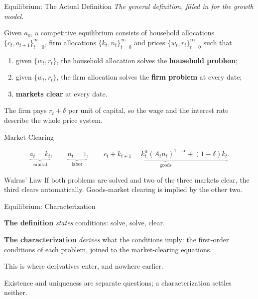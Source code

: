 \documentclass[11pt,aspectratio=169,c]{beamer}
\begin{document}
\begin{frame}{Equilibrium: The Actual Definition}
  \emph{The general definition, filled in for the growth model.}

  \vspace{.2em}
  \begin{definitionbox}
    Given $a_0$, a competitive equilibrium consists of household allocations
    $\{c_t,a_{t+1}\}_{t=0}^{\infty}$, firm allocations
    $\{k_t,n_t\}_{t=0}^{\infty}$ and prices $\{w_t,r_t\}_{t=0}^{\infty}$
    such that
    \begin{enumerate}
      \item given $\{w_t,r_t\}$, the household allocation solves the
      \textbf{household problem};
      \item given $\{w_t,r_t\}$, the firm allocation solves the
      \textbf{firm problem} at every date;
      \item \textbf{markets clear} at every date.
    \end{enumerate}
  \end{definitionbox}

  The firm pays $r_t+\delta$ per unit of capital, so the wage and the interest
  rate describe the whole price system.
\end{frame}

\begin{frame}{Market Clearing}
  \begin{definitionbox}
    \[
      \underbrace{a_t=k_t}_{\text{capital}},
      \qquad
      \underbrace{n_t=1}_{\text{labor}},
      \qquad
      \underbrace{c_t+k_{t+1}=k_t^\alpha(A_tn_t)^{1-\alpha}+(1-\delta)k_t}_{\text{goods}} .
    \]
  \end{definitionbox}

  \begin{block}{Walras' Law}
    If both problems are solved and two of the three markets clear, the third
    clears automatically. Goods-market clearing is implied by the other two.
  \end{block}
\end{frame}

\begin{frame}{Equilibrium: Characterization}
  \begin{definitionbox}
    \textbf{The definition} \emph{states} conditions: solve, solve, clear.\par
    \smallskip
    \textbf{The characterization} \emph{derives} what the conditions imply:
    the first-order conditions of each problem, joined to the market-clearing
    equations.
  \end{definitionbox}

  This is where derivatives enter, and nowhere earlier.

  \vspace{.35em}
  Existence and uniqueness are separate questions; a characterization settles
  neither.
\end{frame}
\end{document}

